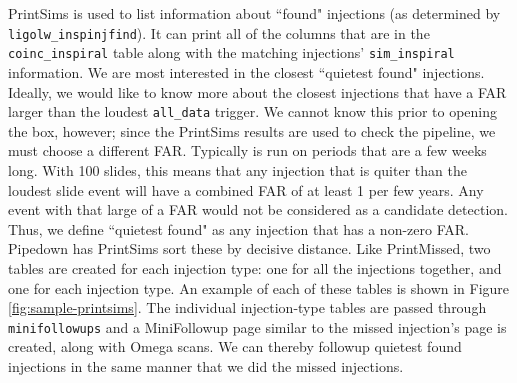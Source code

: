 PrintSims is used to list information about ``found" injections (as determined by \verb|ligolw_inspinjfind|). It can print all of the columns that are in the \verb|coinc_inspiral| table along with the matching injections' \verb|sim_inspiral| information. We are most interested in the closest ``quietest found" injections. Ideally, we would like to know more about the closest injections that have a \ac{FAR} larger than the loudest \verb|all_data| trigger. We cannot know this prior to opening the box, however; since the PrintSims results are used to check the pipeline, we must choose a different \ac{FAR}. Typically \ihope is run on periods that are a few weeks long. With 100 slides, this means that any injection that is quiter than the loudest slide event will have a combined \ac{FAR} of at least 1 per few years. Any event with that large of a \ac{FAR} would not be considered as a candidate detection. Thus, we define ``quietest found" as any injection that has a non-zero \ac{FAR}. Pipedown has PrintSims sort these by decisive distance. Like PrintMissed, two tables are created for each injection type: one for all the injections together, and one for each injection type. An example of each of these tables is shown in Figure \ref{fig:sample-printsims}. The individual injection-type tables are passed through \verb|minifollowups| and a MiniFollowup page similar to the missed injection's page is created, along with Omega scans. We can thereby followup quietest found injections in the same manner that we did the missed injections.

